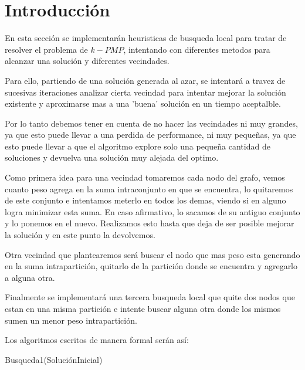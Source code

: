 \section{Introducci\'on}

En esta sección se implementarán heuristicas de busqueda local para tratar de resolver el problema de $k-PMP$, intentando con diferentes metodos para alcanzar una solución y diferentes vecindades.

Para ello, partiendo de una solución generada al azar, se intentará a travez de sucesivas iteraciones analizar cierta vecindad para intentar mejorar la solución existente y aproximarse mas a una 'buena' solución en un tiempo aceptalble. 

Por lo tanto debemos tener en cuenta de no hacer las vecindades ni muy grandes, ya que esto puede llevar a una perdida de performance, ni muy pequeñas, ya que esto puede llevar a que el algoritmo explore solo una pequeña cantidad de soluciones y devuelva una solución muy alejada del optimo.

Como primera idea para una vecindad tomaremos cada nodo del grafo, vemos cuanto peso agrega en la suma intraconjunto en que se encuentra, lo quitaremos de este conjunto e intentamos meterlo en todos los demas, viendo si en alguno logra minimizar esta suma. En caso afirmativo, lo sacamos de su antiguo conjunto y lo ponemos en el nuevo. Realizamos esto hasta que deja de ser posible mejorar la solución y en este punto la devolvemos.

Otra vecindad que plantearemos será buscar el nodo que mas peso esta generando en la suma intrapartición, quitarlo de la partición donde se encuentra y agregarlo a alguna otra.

Finalmente se implementará una tercera busqueda local que quite dos nodos que estan en una misma partición e intente buscar alguna otra donde los mismos sumen un menor peso intrapartición.

Los algoritmos escritos de manera formal serán así:

\begin{algorithm}
  	\begin{algorithmic}[1]\parskip=1mm
		 \caption{ Busqueda1(SoluciónInicial) }
	\end{algorithmic}
\end{algorithm}

